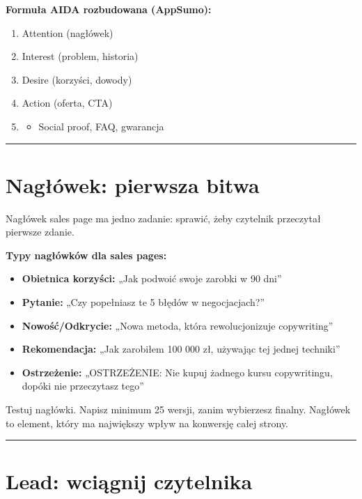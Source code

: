 \documentclass[
  12pt,
  a4paper,
  twoside,
  openright,
  12pt,
  DIV=12,
  BCOR=12mm]{scrbook}
\providecommand{\tightlist}{%
  \setlength{\itemsep}{0pt}\setlength{\parskip}{0pt}}\usepackage{longtable,booktabs,array}
\newcommand{\decoline}{%
  \begin{center}
    \textcolor{bordergray}{\rule{0.3\textwidth}{0.5pt}}
  \end{center}
}
\begin{document}
\textbf{Formuła AIDA rozbudowana (AppSumo):}

\begin{enumerate}
\def\labelenumi{\arabic{enumi}.}
\tightlist
\item
  Attention (nagłówek)
\item
  Interest (problem, historia)
\item
  Desire (korzyści, dowody)
\item
  Action (oferta, CTA)
\item
  \begin{itemize}
  \tightlist
  \item
    Social proof, FAQ, gwarancja
  \end{itemize}
\end{enumerate}

\decoline

\section{Nagłówek: pierwsza bitwa}\label{nagux142uxf3wek-pierwsza-bitwa}

Nagłówek sales page ma jedno zadanie: sprawić, żeby czytelnik przeczytał
pierwsze zdanie.

\textbf{Typy nagłówków dla sales pages:}

\begin{itemize}
\tightlist
\item
  \textbf{Obietnica korzyści:} „Jak podwoić swoje zarobki w 90 dni''
\item
  \textbf{Pytanie:} „Czy popełniasz te 5 błędów w negocjacjach?''
\item
  \textbf{Nowość/Odkrycie:} „Nowa metoda, która rewolucjonizuje
  copywriting''
\item
  \textbf{Rekomendacja:} „Jak zarobiłem 100 000 zł, używając tej jednej
  techniki''
\item
  \textbf{Ostrzeżenie:} „OSTRZEŻENIE: Nie kupuj żadnego kursu
  copywritingu, dopóki nie przeczytasz tego''
\end{itemize}

\begin{wskazowka}
Testuj nagłówki. Napisz minimum 25 wersji, zanim wybierzesz finalny. Nagłówek to element, który ma największy wpływ na konwersję całej strony.
\end{wskazowka}

\decoline

\section{Lead: wciągnij czytelnika}\label{lead-wciux105gnij-czytelnika}
\end{document}
